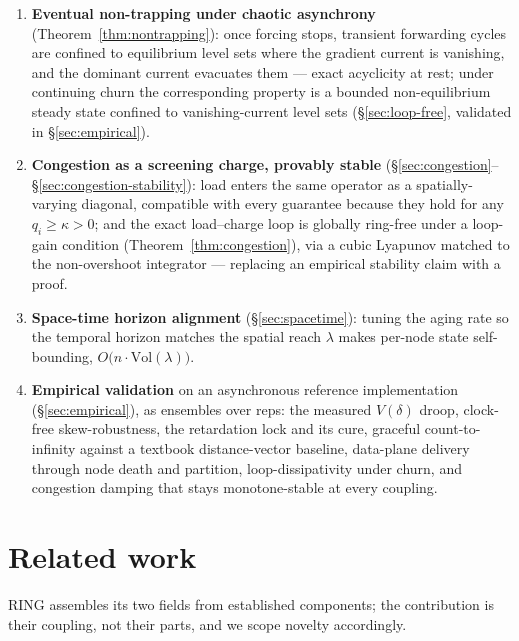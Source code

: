 \documentclass[11pt]{article}
\theoremstyle{plain}
\numberwithin{equation}{section}
\begin{document}
\begin{enumerate}
\item \textbf{Eventual non-trapping under chaotic asynchrony} (Theorem~\ref{thm:nontrapping}): once forcing stops, transient forwarding cycles are confined to equilibrium level sets where the gradient current is vanishing, and the dominant current evacuates them — exact acyclicity at rest; under continuing churn the corresponding property is a bounded non-equilibrium steady state confined to vanishing-current level sets (§\ref{sec:loop-free}, validated in §\ref{sec:empirical}).
\item \textbf{Congestion as a screening charge, provably stable} (§\ref{sec:congestion}–§\ref{sec:congestion-stability}): load enters the same operator as a spatially-varying diagonal, compatible with every guarantee because they hold for any $q_i\ge\kappa>0$; and the exact load–charge loop is globally ring-free under a loop-gain condition (Theorem~\ref{thm:congestion}), via a cubic Lyapunov matched to the non-overshoot integrator — replacing an empirical stability claim with a proof.
\item \textbf{Space-time horizon alignment} (§\ref{sec:spacetime}): tuning the aging rate so the temporal horizon matches the spatial reach $\lambda$ makes per-node state self-bounding, $O\!\big(n\cdot\mathrm{Vol}(\lambda)\big)$.
\item \textbf{Empirical validation} on an asynchronous reference implementation (§\ref{sec:empirical}), as ensembles over reps: the measured $V(\delta)$ droop, clock-free skew-robustness, the retardation lock and its cure, graceful count-to-infinity against a textbook distance-vector baseline, data-plane delivery through node death and partition, loop-dissipativity under churn, and congestion damping that stays monotone-stable at every coupling.
\end{enumerate}

\section{Related work}\label{sec:related}

RING assembles its two fields from established components; the contribution is their coupling, not their parts, and we scope novelty accordingly.
\end{document}
